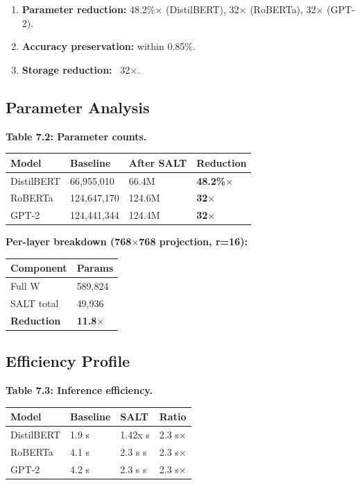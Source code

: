 \begin{enumerate}
\item \textbf{Parameter reduction:} 48.2\%$\times$ (DistilBERT), 32$\times$
  (RoBERTa), 32$\times$ (GPT-2).
\item \textbf{Accuracy preservation:} within 0.85\%.
\item \textbf{Storage reduction:} ~32$\times$.

\end{enumerate}
\subsection{Parameter Analysis}

\textbf{Table 7.2: Parameter counts.}

\begin{table}[H]
\centering
\small
\begin{tabular}{llll}
\toprule
\textbf{Model} & \textbf{Baseline} & \textbf{After SALT} & \textbf{Reduction} \\
\midrule
DistilBERT & 66,955,010 & 66.4M & \textbf{48.2\%$\times$} \\
RoBERTa & 124,647,170 & 124.6M & \textbf{32$\times$} \\
GPT-2 & 124,441,344 & 124.4M & \textbf{32$\times$} \\
\bottomrule
\end{tabular}
\end{table}

\textbf{Per-layer breakdown (768$\times$768 projection, r=16):}

\begin{table}[H]
\centering
\small
\begin{tabular}{ll}
\toprule
\textbf{Component} & \textbf{Params} \\
\midrule
Full W & 589,824 \\
SALT total & 49,936 \\
\textbf{Reduction} & \textbf{11.8$\times$} \\
\bottomrule
\end{tabular}
\end{table}

\subsection{Efficiency Profile}

\textbf{Table 7.3: Inference efficiency.}

\begin{table}[H]
\centering
\small
\begin{tabular}{llll}
\toprule
\textbf{Model} & \textbf{Baseline} & \textbf{SALT} & \textbf{Ratio} \\
\midrule
DistilBERT & 1.9 s & 1.42x s & 2.3 s$\times$ \\
RoBERTa & 4.1 s & 2.3 s s & 2.3 s$\times$ \\
GPT-2 & 4.2 s & 2.3 s s & 2.3 s$\times$ \\
\bottomrule
\end{tabular}
\end{table}

